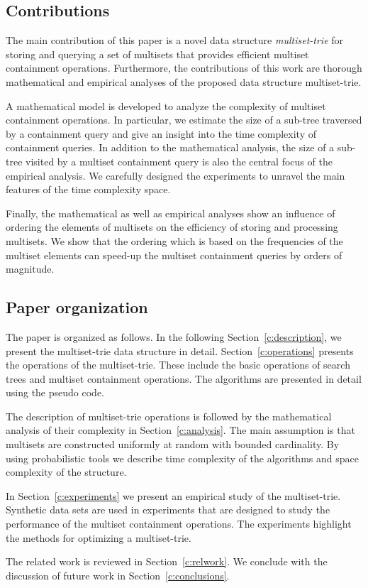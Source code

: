 \subsection{Contributions}

The main contribution of this paper is a novel data structure \emph{multiset-trie} for storing and querying a set of multisets that provides efficient multiset containment operations. Furthermore, the contributions of this work are thorough mathematical and empirical analyses of the proposed data structure multiset-trie. 

A mathematical model is developed to analyze the complexity of multiset containment operations. In particular, we estimate the size of a sub-tree traversed by a containment query and give an insight into the time complexity of containment queries. 
In addition to the mathematical analysis, the size of a sub-tree visited by a multiset containment query is also the central focus of the empirical analysis. We carefully designed the experiments to unravel the main features of the time complexity space. 

Finally, the mathematical as well as empirical analyses show an influence of ordering the elements of multisets on the efficiency of storing and processing multisets. We show that the ordering which is based on the frequencies of the multiset elements can speed-up the multiset containment queries by orders of magnitude.

\subsection{Paper organization}

The paper is organized as follows. In the following Section~\ref{c:description}, we present the multiset-trie data structure in detail.
Section~\ref{c:operations} presents the operations of the multiset-trie. These include the basic operations of search trees and multiset containment operations. The algorithms are presented in detail using the pseudo code. 

The description of multiset-trie operations is followed by the mathematical analysis of their complexity in Section~\ref{c:analysis}. The main assumption is that multisets are constructed uniformly at random with bounded cardinality. By using probabilistic tools we describe time complexity of the algorithms and space complexity of the structure.

In Section~\ref{c:experiments} we present an empirical study of the multiset-trie. Synthetic data sets are used in experiments that are designed to study the performance of the multiset containment operations. The experiments highlight the methods for optimizing a multiset-trie. 

The related work is reviewed in Section~\ref{c:relwork}. We conclude with the discussion of future work in Section~\ref{c:conclusions}.

